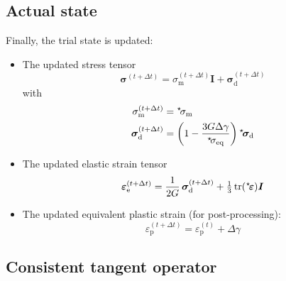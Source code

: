 \documentclass[times,namecite]{goose-article}
\newcommand\leftstar[1]{\hspace*{-.3em}~^\star\!#1}
\begin{document}
\subsection{Actual state}

Finally, the trial state is updated:

\begin{itemize}
%
\item The updated stress tensor
%
\begin{equation}
  \bm{\sigma}^{(t+\Delta t)} = \sigma_\mathrm{m}^{(t+\Delta t)} \bm{I} + \bm{\sigma}_\mathrm{d}^{(t+\Delta t)}
\end{equation}
%
with
%
\begin{align}
  \sigma_\mathrm{m}^{(t+\Delta t)}
  &=
  \leftstar{\sigma}_\mathrm{m}
  \\
  \bm{\sigma}_\mathrm{d}^{(t+\Delta t)}
  &=
  \left( 1 - \frac{3 G \Delta \gamma}{\leftstar{\sigma}_\mathrm{eq}} \right)
  \leftstar{\bm{\sigma}}_\mathrm{d}
\end{align}
%
\item The updated elastic strain tensor
%
\begin{equation}
  \bm{\varepsilon}_\mathrm{e}^{(t+\Delta t)}
  =
  \frac{1}{2G} \, \bm{\sigma}^{(t+\Delta t)}_\mathrm{d} +
  \tfrac{1}{3} \, \mathrm{tr} (\leftstar{\bm{\varepsilon}}) \bm{I}
\end{equation}
%
\item The updated equivalent plastic strain (for post-processing):
%
\begin{equation}
  \varepsilon_\mathrm{p}^{(t+\Delta t)}
  =
  \varepsilon_\mathrm{p}^{(t)} +
  \Delta \gamma
\end{equation}
%
\end{itemize}

\subsection{Consistent tangent operator}
\end{document}
